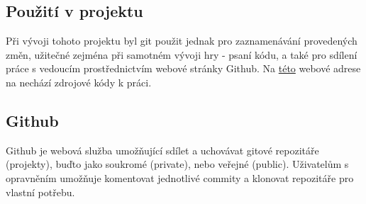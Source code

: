 \documentclass[main.tex]{subfiles}
\begin{document}
\subsection{Použití v projektu}
Při vývoji tohoto projektu byl git použit jednak pro zaznamenávání provedených změn, užitečné zejména při samotném vývoji hry - psaní kódu, a také pro sdílení práce s vedoucím prostřednictvím webové stránky Github. Na \href{https://github.com/vojta006/mp}{této} webové adrese na nechází zdrojové kódy k práci.

\subsection{Github}
Github je webová služba umožňující sdílet a uchovávat gitové repozitáře (projekty), buďto jako soukromé (private), nebo veřejné (public). Uživatelům s opravněním umožňuje komentovat jednotlivé commity a klonovat repozitáře pro vlastní potřebu. 
\end{document}

